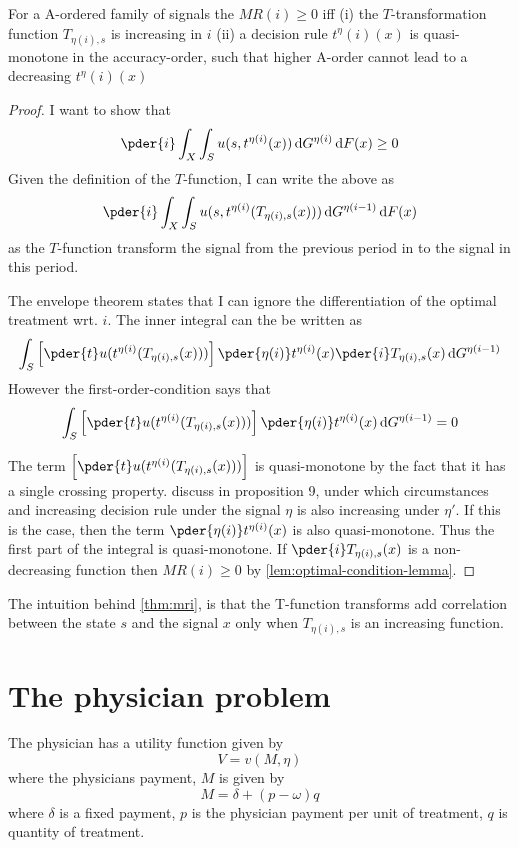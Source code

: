 \documentclass[11pt,a4paper,twoside]{article}
\begin{document}
\begin{theorem}\label{thm:mri}
For a A-ordered family of signals the \(MR(i)\geq0\) iff (i) the \(T\)-transformation function \(T_{\eta(i),s}\) is increasing in \(i\) (ii) a decision rule \(t^\eta(i)(x)\) is quasi-monotone in the accuracy-order, such that higher A-order cannot lead to a decreasing \(t^\eta(i)(x)\)
\end{theorem}
\begin{proof}
I want to show that
\[
	\pder{i}\int_X\int_S u(s,t^{\eta(i)}(x))\dif G^{\eta(i)}\dif F(x)\geq0
\]
Given the definition of the \(T\)-function, I can write the above as
\[
	\pder{i}\int_X\int_S u(s,t^{\eta(i)}(T_{\eta(i),s}(x)))\dif G^{\eta(i-1)}\dif F(x)
\]
as the \(T\)-function transform the signal from the previous period in to the signal in this period.

The envelope theorem states that I can ignore the differentiation of the optimal treatment wrt. \(i\). The inner integral can the be written as
\[
	\int_S \left[\pder{t}u(t^{\eta(i)}(T_{\eta(i),s}(x)))\right]\pder{\eta(i)}t^{\eta(i)}(x)\pder{i}T_{\eta(i),s}(x)\dif G^{\eta(i-1)}
\]
However the first-order-condition says that
\[
	\int_S \left[\pder{t}u(t^{\eta(i)}(T_{\eta(i),s}(x)))\right]\pder{\eta(i)}t^{\eta(i)}(x)\dif G^{\eta(i-1)}=0
\]

The term \(\left[\pder{t}u(t^{\eta(i)}(T_{\eta(i),s}(x)))\right]\) is quasi-monotone by the fact that it has a single crossing property. \textcite{Quah2009} discuss in proposition 9, under which circumstances and increasing decision rule under the signal \(\eta\) is also increasing under \(\eta'\). If this is the case, then the term \(\pder{\eta(i)}t^{\eta(i)}(x)\) is also quasi-monotone. Thus the first part of the integral is quasi-monotone. If \(\pder{i}T_{\eta(i),s}(x)\) is a non-decreasing function then \(MR(i)\geq0\) by \cref{lem:optimal-condition-lemma}.
\end{proof}
The intuition behind \cref{thm:mri}, is that the T-function transforms add correlation between the state \(s\) and the signal \(x\) only when \(T_{\eta(i),s}\) is an increasing function.

\section{The physician problem}
The physician has a utility function given by
\[
	V=v(M,\eta)
\]
where the physicians payment, \(M\) is given by
\[
	M=\delta+(p-\omega)q
\]
where \(\delta\) is a fixed payment, \(p\) is the physician payment per unit of treatment, \(q\) is quantity of treatment.
\end{document}
